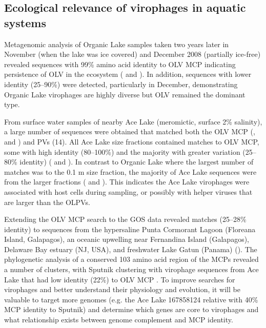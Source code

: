 \subsection{Ecological relevance of virophages in aquatic systems}
Metagenomic analysis of Organic Lake samples taken two years later in November (when the lake was ice covered) and December 2008 (partially ice-free) revealed sequences with 99\% amino acid identity to \ac{OLV} \ac{MCP} indicating persistence of \ac{OLV} in the ecosystem ( and ). 
In addition, sequences with lower identity (25--90\%) were detected, particularly in December, demonstrating Organic Lake virophages are highly diverse but \ac{OLV} remained the dominant type. 



From surface water samples of nearby Ace Lake (meromictic, surface 2\% salinity), a large number of sequences were obtained that matched both the \ac{OLV} \ac{MCP} (,  and ) and \acp{PV} (14). 
All Ace Lake size fractions contained matches to \ac{OLV} \ac{MCP}, some with high identity (80--100\%) and the majority with greater variation (25--80\% identity) ( and ). 
In contrast to Organic Lake where the largest number of matches was to the 0.1 \textmu{}m size fraction, the majority of Ace Lake sequences were from the larger fractions ( and ). 
This indicates the Ace Lake virophages were associated with host cells during sampling, or possibly with helper viruses that are larger than the \acp{OLPV}. 


Extending the \ac{OLV} \ac{MCP} search to the \ac{GOS} data revealed matches (25--28\% identity) to sequences from the hypersaline Punta Cormorant Lagoon (Floreana Island, Galapagos), an oceanic upwelling near Fernandina Island (Galapagos), Delaware Bay estuary (\textsc{NJ}, \textsc{USA}), and freshwater Lake Gatun (Panama) (). 
The phylogenetic analysis of a conserved 103 amino acid region of the \acp{MCP} revealed a number of clusters, with Sputnik clustering with virophage sequences from Ace Lake that had low identity (22\%) to \ac{OLV} \ac{MCP} . 
To improve searches for virophages and better understand their physiology and evolution, it will be valuable to target more genomes (e.g. the Ace Lake 167858124 relative with 40\% MCP identity to Sputnik) and determine which genes are core to virophages and what relationship exists between genome complement and \ac{MCP} identity.
 
